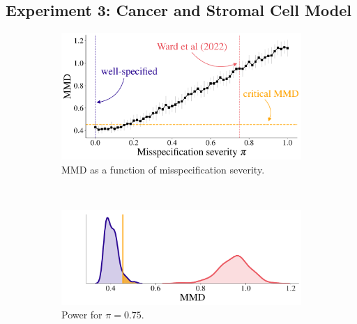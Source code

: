 \documentclass[twoside,11pt]{article}
\newcommand{\numberCS}{3}
\newcommand{\0}{\boldsymbol{0}}
\begin{document}
\subsection{Experiment \numberCS: Cancer and Stromal Cell Model}
\begin{figure}[t]
    \centering%
    \begin{minipage}[b]{0.5\linewidth}%
        \begin{subfigure}[t]{\linewidth}%
            \includegraphics[width=\linewidth]{plots/cs_mms_mmd.pdf}%
            \caption{MMD as a function of misspecification severity.}%
            \label{fig:cs:mms-mmd}%
        \end{subfigure}\\
        \begin{subfigure}[t]{\linewidth}%
                \includegraphics[width=\linewidth]{plots/cs_mms_power.pdf}%
                \caption{Power for $\pi=0.75$.}%
            \label{fig:cs:power}%
        \end{subfigure}%
    \end{minipage}%
    \begin{subfigure}[t]{0.49\linewidth}%

\end{subfigure}
\end{figure}
\end{document}
